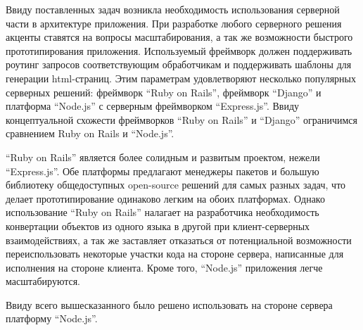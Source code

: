 Ввиду поставленных задач возникла необходимость использования серверной части в
архитектуре приложения. При разработке любого серверного решения
акценты ставятся на вопросы масштабирования, а так же возможности быстрого
прототипирования приложения. Используемый фреймворк должен
поддерживать роутинг запросов соответствующим обработчикам и поддерживать
шаблоны для генерации html-страниц. Этим параметрам удовлетворяют
несколько популярных серверных решений: фреймворк ``Ruby on Rails'', фреймворк
``Django'' и платформа ``Node.js'' с серверным фреймворком
``Express.js''\cite{expressjs}. Ввиду
концептуальной схожести фреймворков ``Ruby on Rails'' и ``Django'' ограничимся сравнением Ruby on Rails и ``Node.js''.


``Ruby on Rails'' является более солидным и развитым проектом, нежели
``Express.js''. Обе платформы предлагают менеджеры пакетов и большую библиотеку
общедоступных open-source решений для самых разных задач, что делает
прототипирование одинаково легким на обоих платформах. Однако использование
``Ruby on Rails'' налагает на разработчика необходимость конвертации объектов из
одного языка в другой при клиент-серверных взаимодействиях, а так же заставляет
отказаться от потенциальной возможности переиспользовать некоторые участки кода
на стороне сервера, написанные для исполнения на стороне клиента. Кроме того,
``Node.js'' приложения легче масштабируются.

Ввиду всего вышесказанного было решено использовать  на
стороне сервера платформу ``Node.js''.


